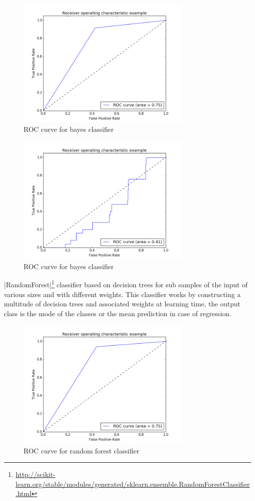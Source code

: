 \begin{figure}[ht!]
\centering
\includegraphics[width=23em]{images/out_bn.png}
\caption{ROC curve for bayes classifier}
\end{figure}

\begin{figure}[ht!]
\centering
\includegraphics[width=23em]{images/out_bn2.png}
\caption{ROC curve for bayes classifier}
\end{figure}

\FloatBarrier

|RandomForest|\footnote{\url{http://scikit-learn.org/stable/modules/generated/sklearn.ensemble.RandomForestClassifier.html}} classifier based on decision trees for sub samples of the input of various sizes and with different weights. This classifier works by constructing a multitude of decision trees and associated weights at learning time, the output class is the mode of the classes or the mean prediction in case of regression.

\begin{figure}[ht!]
\centering
\includegraphics[width=23em]{images/out_forest_2.png}
\caption{ROC curve for random forest classifier}
\end{figure}

